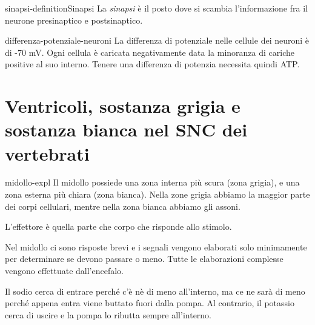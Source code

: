 \documentclass[preview]{standalone}
\begin{document}
\begin{snippetdefinition}{sinapsi-definition}{Sinapsi}
    La \textit{sinapsi} è il posto dove si scambia l'informazione
    fra il neurone presinaptico e postsinaptico.
\end{snippetdefinition}

\begin{snippet}{differenza-potenziale-neuroni}
    La differenza di potenziale nelle cellule dei neuroni è di -70 mV. Ogni cellula è caricata
    negativamente data la minoranza di cariche positive al suo interno.
    Tenere una differenza di potenzia necessita quindi ATP.
\end{snippet}

\section{Ventricoli, sostanza grigia e sostanza bianca nel SNC dei vertebrati}

\begin{snippet}{midollo-expl}
    Il midollo possiede una zona interna più scura (zona grigia), e una zona esterna più chiara
    (zona bianca). Nella zone grigia abbiamo la maggior parte dei corpi cellulari,
    mentre nella zona bianca abbiamo gli assoni.

    L'effettore è quella parte che corpo che risponde allo stimolo.

    Nel midollo ci sono risposte brevi e i segnali vengono elaborati solo minimamente per determinare se devono passare o meno.
    Tutte le elaborazioni complesse vengono effettuate dall'encefalo.

    Il sodio cerca di entrare perché c'è nè di meno all'interno, ma ce ne sarà di meno perché appena entra
    viene buttato fuori dalla pompa.
    Al contrario, il potassio cerca di uscire e la pompa lo ributta sempre all'interno.

\end{snippet}
\end{document}
